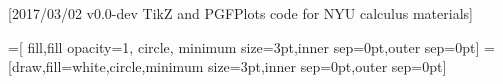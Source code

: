 [2017/03/02 v0.0-dev TikZ and PGFPlots code for NYU calculus materials]
\usepackage{tikz}

\usetikzlibrary{%
    positioning,
    shapes,
}
=[
    fill,fill opacity=1,
    circle,
    minimum size=3pt,inner sep=0pt,outer sep=0pt]
=[draw,fill=white,circle,minimum size=3pt,inner sep=0pt,outer sep=0pt]


